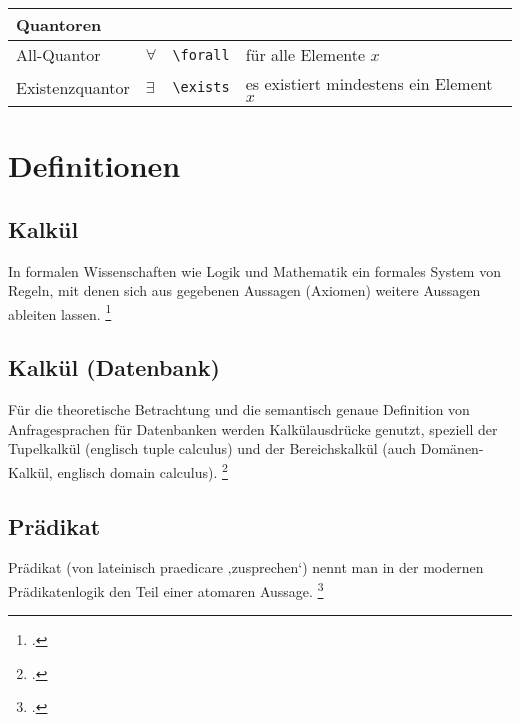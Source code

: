 \documentclass{lehramt-informatik}
\begin{document}
\begin{tabular}{l|l|l|l}
\hline

\multicolumn{4}{l}{Quantoren} \\

\hline
\hline

All-Quantor & $\forall$ & \verb|\forall| & für alle Elemente $x$ \\

Existenzquantor & $\exists$ & \verb|\exists| & es existiert mindestens ein Element $x$\\

\end{tabular}

%

\section{Definitionen}

%

\subsection{Kalkül}

In formalen Wissenschaften wie Logik und Mathematik ein formales System
von Regeln, mit denen sich aus gegebenen Aussagen (Axiomen) weitere
Aussagen ableiten lassen.
\footcite{wiki:kalkuel}

%

\subsection{Kalkül (Datenbank)}

Für die theoretische Betrachtung und die semantisch genaue Definition
von Anfragesprachen für Datenbanken werden Kalkülausdrücke genutzt,
speziell der Tupelkalkül (englisch tuple calculus) und der
Bereichskalkül (auch Domänen-Kalkül, englisch domain calculus).
\footcite{wiki:kalkuel-datenbank}

%

\subsection{Prädikat}

Prädikat (von lateinisch praedicare ‚zusprechen‘) nennt man in der
modernen Prädikatenlogik den Teil einer atomaren Aussage.
\footcite{wiki:praedikat-logik}
\end{document}

